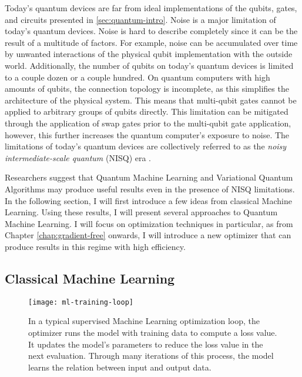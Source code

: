 Today's quantum devices are far from ideal implementations of the qubits, gates,
and circuits presented in \autoref{sec:quantum-intro}.
Noise is a major limitation of today's quantum devices.
Noise is hard to describe completely since it can be the result of a multitude
of factors.
For example, noise can be accumulated over time by unwanted interactions of the
physical qubit implementation with the outside world.
Additionally, the number of qubits on today's quantum devices is limited to a
couple dozen or a couple hundred.
On quantum computers with high amounts of qubits, the connection topology is
incomplete, as this simplifies the architecture of the physical system. 
This means that multi-qubit gates cannot be applied to arbitrary groups of
qubits directly.
This limitation can be mitigated through the application of swap gates prior
to the multi-qubit gate application, however, this further increases the quantum
computer's exposure to noise.
The limitations of today's quantum devices are collectively referred to as the
\emph{noisy intermediate-scale quantum} (NISQ) era
\cite{preskill_quantum_2018,nielsen_quantum_2007}.

Researchers suggest that Quantum Machine Learning and Variational Quantum
Algorithms may produce useful results even in the presence of NISQ limitations.
In the following section, I will first introduce a few ideas from classical
Machine Learning.
Using these results, I will present several approaches to Quantum Machine
Learning.
I will focus on optimization techniques in particular, as from Chapter
\ref{chap:gradient-free} onwards, I will introduce a new optimizer that can
produce results in this regime with high efficiency.

\subsection{Classical Machine Learning}
\begin{figure}
    \centering
    \texttt{[image: ml-training-loop]}
    \caption{In a typical supervised Machine Learning optimization loop, the
        optimizer runs the model with training data to compute a loss value.
        It updates the model's parameters to reduce the loss value in the next
        evaluation.
        Through many iterations of this process, the model learns the relation
        between input and output data.}
    \label{fig:ml-training-loop}
\end{figure}


